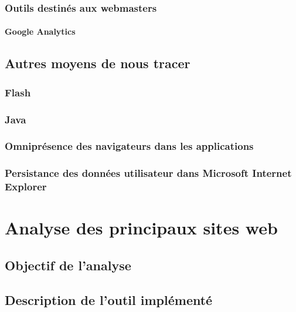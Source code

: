 \documentclass[a4paper,12pt,french]{report}
\begin{document}
	\subsection{Outils destinés aux webmasters}
		
		\subsubsection{Google Analytics}

\section{Autres moyens de nous tracer}
	\subsection{Flash}
	
	\subsection{Java}
	
	\subsection{Omniprésence des navigateurs dans les applications}
		
	\subsection{Persistance des données utilisateur dans Microsoft Internet Explorer}
		
	

\chapter{Analyse des principaux sites web}
\section{Objectif de l'analyse}
\section{Description de l'outil implémenté}
\end{document}

